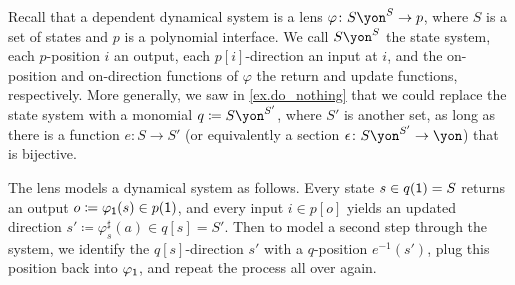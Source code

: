 \documentclass[Book-Poly]{subfiles}
\begin{document}
Recall that a dependent dynamical system is a lens $\varphi\colon S\yon^S\to p$, where $S$ is a set of states and $p$ is a polynomial interface.
We call $S\yon^S$ the state system, each $p$-position $i$ an output, each $p[i]$-direction an input at $i$, and the on-position and on-direction functions of $\varphi$ the return and update functions, respectively.
More generally, we saw in \cref{ex.do_nothing} that we could replace the state system with a monomial $q\coloneqq S\yon^{S'}$, where $S'$ is another set, as long as there is a function $e\colon S\to S'$ (or equivalently a section $\epsilon\colon S\yon^{S'}\to\yon$) that is bijective.

The lens models a dynamical system as follows.
Every state $s\in q(\textsf{1})=S$ returns an output $o\coloneqq\varphi_{\textsf{1}}(s)\in p(\textsf{1})$, and every input $i\in p[o]$ yields an updated direction $s'\coloneqq\varphi^\sharp_s(a)\in q[s]=S'$.
Then to model a second step through the system, we identify the $q[s]$-direction $s'$ with a $q$-position $e^{-1}(s')$, plug this position back into $\varphi_{\textsf{1}}$, and repeat the process all over again.

\end{document}
